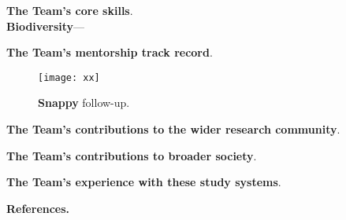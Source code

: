 \textbf{\large The Team's core skills}.
%
\\\textbf{Biodiversity}---\blindtext

\textbf{\large The Team's mentorship track record}. \blindtext

\begin{wrapfigure}[14]{r}{.3\textwidth}
  \vspace{-48pt}
  \center
  \texttt{[image: xx]}
  \caption{\textbf{Snappy} follow-up.}
  \label{xx}
\end{wrapfigure}
\textbf{\large The Team's contributions to the wider research community}. \blindtext

\textbf{\large The Team's contributions to broader society}. \blindtext

\textbf{\large The Team's experience with these study systems}. \blindtext

\begin{spacing}{.3}
  \textbf{References.}
  \printbibliography[heading=none]
\end{spacing}

